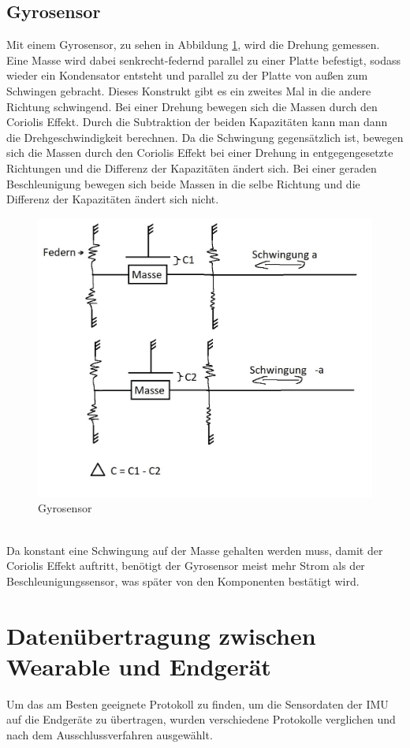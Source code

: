 \subsection{Gyrosensor}
Mit einem Gyrosensor, zu sehen in Abbildung \ref{fig:pic_gyro}, wird die Drehung gemessen.
Eine Masse wird dabei senkrecht-federnd parallel zu einer Platte befestigt, sodass wieder ein Kondensator entsteht und parallel zu der Platte von außen zum Schwingen gebracht.
Dieses Konstrukt gibt es ein zweites Mal in die andere Richtung schwingend.
Bei einer Drehung bewegen sich die Massen durch den Coriolis Effekt.
Durch die Subtraktion der beiden Kapazitäten kann man dann die Drehgeschwindigkeit berechnen.
Da die Schwingung gegensätzlich ist, bewegen sich die Massen durch den Coriolis Effekt bei einer Drehung in entgegengesetzte Richtungen und die Differenz der Kapazitäten ändert sich.
Bei einer geraden Beschleunigung bewegen sich beide Massen in die selbe Richtung und die Differenz der Kapazitäten ändert sich nicht. \cite{gyrosensor}
\begin{figure}[h]
	\centering
	\includegraphics[width=0.65\linewidth]{res/gyro.jpg}
	\caption{Gyrosensor}
	\label{fig:pic_gyro}
\end{figure}\\
Da konstant eine Schwingung auf der Masse gehalten werden muss, damit der Coriolis Effekt auftritt, benötigt der Gyrosensor meist mehr Strom als der Beschleunigungssensor, was später von den Komponenten bestätigt wird.

\section{Datenübertragung zwischen Wearable und Endgerät}
Um das am Besten geeignete Protokoll zu finden, um die Sensordaten der IMU auf die Endgeräte zu übertragen, wurden verschiedene Protokolle verglichen und nach dem Ausschlussverfahren ausgewählt.

